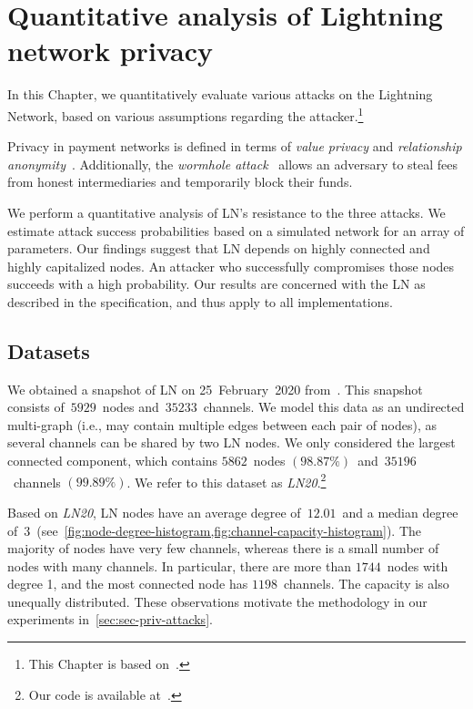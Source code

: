 \chapter{Quantitative analysis of Lightning network privacy}

\label{Chapter07LNattacks}

In this Chapter, we quantitatively evaluate various attacks on the Lightning Network, based on various assumptions regarding the attacker.\footnote{This Chapter is based on~\cite{Tikhomirov2020a}.}

Privacy in payment networks is defined in terms of \textit{value privacy} and \textit{relationship anonymity}~\cite{Malavolta2017}.
Additionally, the \textit{wormhole attack}~\cite{Malavolta2019} allows an adversary to steal fees from honest intermediaries and temporarily block their funds.

We perform a quantitative analysis of LN's resistance to the three attacks.
We estimate attack success probabilities based on a simulated network for an array of parameters.
Our findings suggest that LN depends on highly connected and highly capitalized nodes.
An attacker who successfully compromises those nodes succeeds with a high probability.
Our results are concerned with the LN as described in the specification, and thus apply to all implementations.


\section{Datasets}
\label{sec:datasets}

We obtained a snapshot of LN on 25~February~2020 from~\cite{fiatjaf2020}.
This snapshot consists of~$5929$~nodes and~$35233$~channels.
We model this data as an undirected multi-graph (i.e., may contain multiple edges between each pair of nodes), as several channels can be shared by two LN nodes.
We only considered the largest connected component, which contains $5862$~nodes $(98.87\%)$~and~$35196$~channels $(99.89\%)$.
We refer to this dataset as \emph{LN20}.\footnote{Our code is available at~\cite{Tikhomirov2019}.}

Based on \emph{LN20}, 
LN nodes have an average degree of~$12.01$~and a median degree of~$3$~(see~\cref{fig:node-degree-histogram,fig:channel-capacity-histogram}).
The majority of nodes have very few channels, 
whereas there is a small number of nodes with many channels.
In particular, there are more than $1744$~nodes with degree 1, and the most connected node has $1198$~channels.
The capacity is also unequally distributed.
These observations motivate the methodology in our experiments in~\cref{sec:sec-priv-attacks}.

